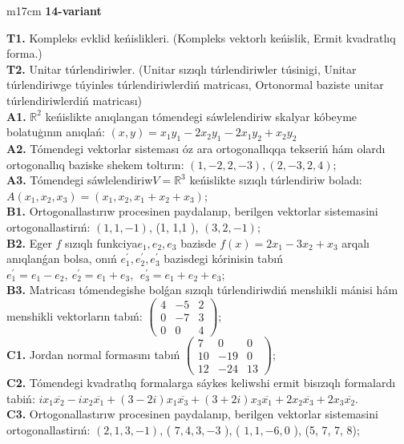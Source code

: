 \documentclass{article}
\begin{document}
\vspace{1cm}


\begin{tabular}{m{17cm}}
\textbf{14-variant}
\newline

\textbf{T1.} Kompleks evklid keńislikleri.  (Kompleks vektorlı keńislik, Ermit kvadratlıq forma.) \\
\textbf{T2.} Unitar túrlendiriwler. (Unitar sızıqlı túrlendiriwler túsinigi,  Unitar túrlendiriwge túyinles túrlendiriwlerdiń matricası,   Ortonormal baziste unitar túrlendiriwlerdiń matricası) \\
\textbf{A1.} \(\mathbb{R}^{2}\) keńislikte anıqlangan tómendegi sáwlelendiriw skalyar kóbeyme bolatuģının anıqlań: \((x,y) = x_{1}y_{1} - 2x_{2}y_{1} - 2x_{1}y_{2} + x_{2}y_{2}\) \\
\textbf{A2.} Tómendegi vektorlar sisteması óz ara ortogonallıqqa tekseriń hám olardı ortogonallıq baziske shekem toltırın: \((1, - 2,2, - 3),(2, - 3,2,4)\); \\
\textbf{A3.} Tómendegi sáwlelendiriw\(V = \mathbb{R}^{3}\) keńislikte sızıqlı túrlendiriw boladı: \(A\left( x_{1},x_{2},x_{3} \right) = \left( x_{1},x_{2},x_{1} + x_{2} + x_{3} \right)\); \\
\textbf{B1.} Ortogonallastırıw procesinen paydalanıp, berilgen vektorlar sistemasini ortogonallastirıń: \((1,1, - 1)\), (1, 1,1 ), \((3,2, - 1)\); \\
\textbf{B2.} Eger \(f\) sızıqlı funkciya\(e_{1},e_{2},e_{3}\) bazisde \(f(x) = 2x_{1} - 3x_{2} + x_{3}\) arqalı anıqlanǵan bolsa, onıń \(e_{1}^{'},e_{2}^{'},e_{3}^{'}\) bazisdegi kórinisin tabıń\(e_{1}^{'} = e_{1} - e_{2},\ e_{2}^{'} = e_{1} + e_{3},\ \ e_{3}^{'} = e_{1} + e_{2} + e_{3}\); \\
\textbf{B3.} Matricası tómendegishe bolǵan sızıqlı túrlendiriwdiń menshikli mánisi hám menshikli vektorların tabıń: \(\begin{pmatrix} 4 & - 5 & 2 \\ 0 & - 7 & 3 \\ 0 & 0 & 4 \end{pmatrix}\); \\
\textbf{C1.} Jordan normal formasını tabıń \(\begin{pmatrix} 7 & 0 & 0 \\ 10 & - 19 & 0 \\ 12 & - 24 & 13 \end{pmatrix}\); \\
\textbf{C2.} Tómendegi kvadratlıq formalarga sáykes keliwshi ermit bisızıqlı formalardı tabiń: \(ix_{1}\overline{x_{2}} - ix_{2}\overline{x_{1}} + (3 - 2i)x_{1}\overline{x_{3}} + (3 + 2i)x_{3}\overline{x_{1}} + 2x_{2}\overline{x_{3}} + 2x_{3}\overline{x_{2}}\). \\
\textbf{C3.} Ortogonallastırıw procesinen paydalanıp, berilgen vektorlar sistemasini ortogonallastirıń: \((2,1,3, - 1)\), ( \(7,4,3, - 3\) ), ( \(1,1, - 6,0\) ), (5, 7, 7, 8); \\

\end{tabular}
\vspace{1cm}
\end{document}
